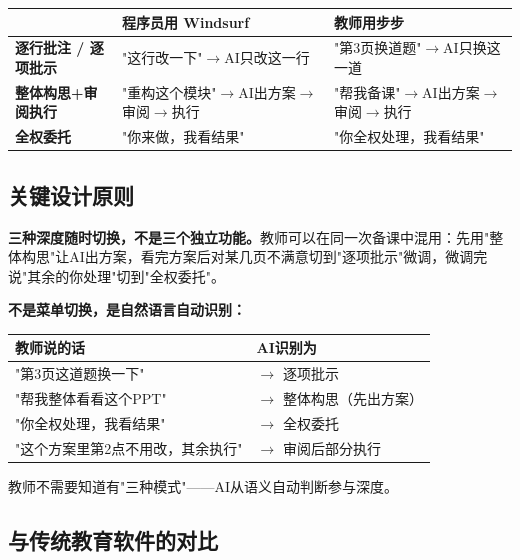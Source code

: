 \documentclass[11pt,a4paper]{article}
\newcommand{\done}{\ding{192}}
\newcommand{\dtwo}{\ding{193}}
\newcommand{\dthree}{\ding{194}}
\begin{document}
\begin{center}\small
\begin{tabularx}{\textwidth}{>{\bfseries}l Y Y}
\toprule
{} & \textbf{程序员用 Windsurf} & \textbf{教师用步步} \\
\midrule
\done{} 逐行批注 / 逐项批示 & "这行改一下"$\rightarrow$AI只改这一行 & "第3页换道题"$\rightarrow$AI只换这一道 \\
 \dtwo{} 整体构思+审阅执行 & "重构这个模块"$\rightarrow$AI出方案$\rightarrow$审阅$\rightarrow$执行 & "帮我备课"$\rightarrow$AI出方案$\rightarrow$审阅$\rightarrow$执行 \\
\dthree{} 全权委托 & "你来做，我看结果" & "你全权处理，我看结果" \\
\bottomrule
\end{tabularx}
\end{center}

\subsection{关键设计原则}

\noindent\textbf{三种深度随时切换，不是三个独立功能。}教师可以在同一次备课中混用：先用"整体构思"让AI出方案，看完方案后对某几页不满意切到"逐项批示"微调，微调完说"其余的你处理"切到"全权委托"。

\medskip
\noindent\textbf{不是菜单切换，是自然语言自动识别：}

\begin{center}\small
\begin{tabularx}{\textwidth}{Y l}
\toprule
{}\textbf{教师说的话} & \textbf{AI识别为} \\
\midrule
"第3页这道题换一下" & $\rightarrow$ 逐项批示 \\
"帮我整体看看这个PPT" & $\rightarrow$ 整体构思（先出方案） \\
"你全权处理，我看结果" & $\rightarrow$ 全权委托 \\
"这个方案里第2点不用改，其余执行" & $\rightarrow$ 审阅后部分执行 \\
\bottomrule
\end{tabularx}
\end{center}

教师不需要知道有"三种模式"——AI从语义自动判断参与深度。

\subsection{与传统教育软件的对比}
\end{document}
